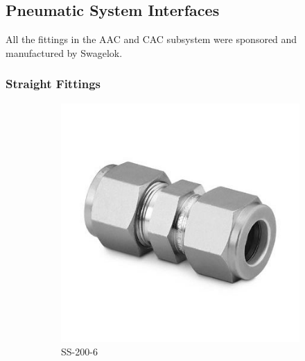 \documentclass[a4paper,12pt,oneside]{article}
\begin{document}
\begin{appendices}
\newpage
\subsection{Pneumatic System Interfaces}
\label{sec:appP}
All the fittings in the AAC and CAC subsystem were sponsored and manufactured by Swagelok.
\subsubsection{Straight Fittings}
\begin{figure}[H]
    \centering
    \begin{subfigure}[b]{0.2\textwidth}
    \centering
    \includegraphics[width=\textwidth]{appendix/img/interfaces/SS-200-6.jpg}
    \caption{SS-200-6}
    \end{subfigure}
    ~
    \begin{subfigure}[b]{0.2\textwidth}
    \centering

\end{subfigure}
\end{figure}
\end{appendices}
\end{document}
